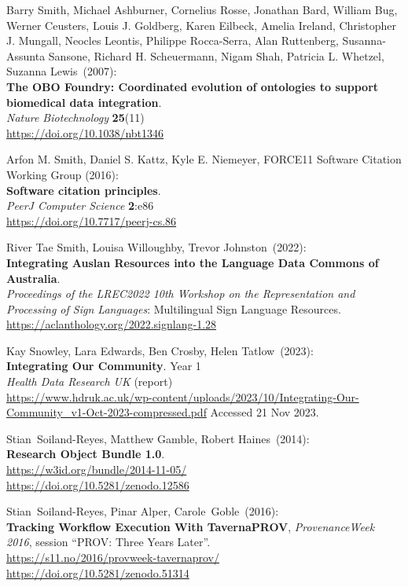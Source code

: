 \begin{thebibliography}{9}
Barry Smith, Michael Ashburner, Cornelius Rosse, Jonathan Bard, William
Bug, Werner Ceusters, Louis J. Goldberg, Karen Eilbeck, Amelia Ireland,
Christopher J. Mungall, Neocles Leontis, Philippe Rocca-Serra, Alan
Ruttenberg, Susanna-Assunta Sansone, Richard H. Scheuermann, Nigam Shah,
Patricia L. Whetzel, Suzanna Lewis~(2007): \\
\textbf{The {OBO Foundry}:
Coordinated evolution of ontologies to support biomedical data
integration}. \\
\emph{Nature Biotechnology} \textbf{25}(11) \\
\url{https://doi.org/10.1038/nbt1346}

Arfon M. Smith, Daniel S. Kattz, Kyle E. Niemeyer, FORCE11 Software Citation Working Group (2016):\\
\textbf{Software citation principles}.\\
\emph{PeerJ Computer Science} \textbf{2}:e86\\
\url{https://doi.org/10.7717/peerj-cs.86}

River Tae Smith, Louisa Willoughby, Trevor Johnston~(2022): \\
\textbf{Integrating Auslan Resources into the Language Data Commons of Australia}.\\
\emph{Proceedings of the LREC2022 10th Workshop on the Representation and Processing of Sign Languages}: Multilingual Sign Language Resources.\\
\url{https://aclanthology.org/2022.signlang-1.28}

Kay Snowley, Lara Edwards, Ben Crosby, Helen Tatlow~(2023): \\
\textbf{Integrating Our Community}. Year 1 \\
\emph{Health Data Research UK} (report) \\
\url{https://www.hdruk.ac.uk/wp-content/uploads/2023/10/Integrating-Our-Community_v1-Oct-2023-compressed.pdf}
Accessed 21 Nov 2023.

Stian~Soiland-Reyes, Matthew Gamble, Robert Haines~(2014): \\
\textbf{Research Object Bundle 1.0}.\\
\url{https://w3id.org/bundle/2014-11-05/}\\
\url{https://doi.org/10.5281/zenodo.12586}

Stian~Soiland-Reyes, Pinar Alper, Carole~Goble~(2016): \\
\textbf{Tracking Workflow Execution With TavernaPROV},
\emph{ProvenanceWeek 2016}, session ``PROV: Three Years Later''.\\
\url{https://s11.no/2016/provweek-tavernaprov/}\\
\url{https://doi.org/10.5281/zenodo.51314}


\end{thebibliography}
